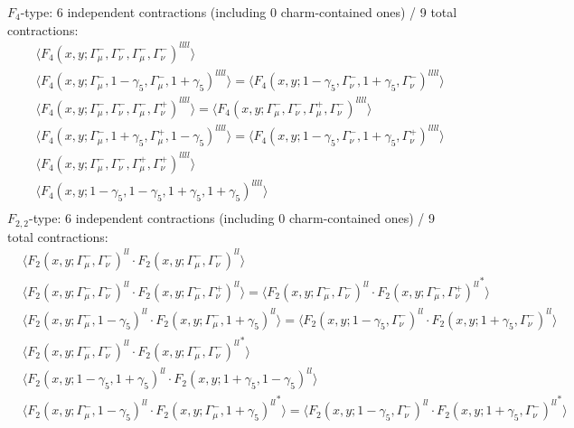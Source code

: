 $F_4$-type: 6 independent contractions (including 0 charm-contained ones) / 9 total contractions:
\begin{align*}
&\Big\langle F_4(x,y;\Gamma_\mu^-,\Gamma_\nu^-,\Gamma_\mu^-,\Gamma_\nu^-)^{llll}\Big\rangle\\
&\Big\langle F_4(x,y;\Gamma_\mu^-,1-\gamma_5,\Gamma_\mu^-,1+\gamma_5)^{llll}\Big\rangle
=\Big\langle F_4(x,y;1-\gamma_5,\Gamma_\nu^-,1+\gamma_5,\Gamma_\nu^-)^{llll}\Big\rangle\\
&\Big\langle F_4(x,y;\Gamma_\mu^-,\Gamma_\nu^-,\Gamma_\mu^-,\Gamma_\nu^+)^{llll}\Big\rangle
=\Big\langle F_4(x,y;\Gamma_\mu^-,\Gamma_\nu^-,\Gamma_\mu^+,\Gamma_\nu^-)^{llll}\Big\rangle\\
&\Big\langle F_4(x,y;\Gamma_\mu^-,1+\gamma_5,\Gamma_\mu^+,1-\gamma_5)^{llll}\Big\rangle
=\Big\langle F_4(x,y;1-\gamma_5,\Gamma_\nu^-,1+\gamma_5,\Gamma_\nu^+)^{llll}\Big\rangle\\
&\Big\langle F_4(x,y;\Gamma_\mu^-,\Gamma_\nu^-,\Gamma_\mu^+,\Gamma_\nu^+)^{llll}\Big\rangle\\
&\Big\langle F_4(x,y;1-\gamma_5,1-\gamma_5,1+\gamma_5,1+\gamma_5)^{llll}\Big\rangle\\
\end{align*}
$F_{2,2}$-type: 6 independent contractions (including 0 charm-contained ones) / 9 total contractions:
\begin{align*}
&\Big\langle F_2(x,y;\Gamma_\mu^-,\Gamma_\nu^-)^{ll} \cdot F_2(x,y;\Gamma_\mu^-,\Gamma_\nu^-)^{ll}\Big\rangle\\
&\Big\langle F_2(x,y;\Gamma_\mu^-,\Gamma_\nu^-)^{ll} \cdot F_2(x,y;\Gamma_\mu^-,\Gamma_\nu^+)^{ll}\Big\rangle
=\Big\langle F_2(x,y;\Gamma_\mu^-,\Gamma_\nu^-)^{ll} \cdot {F_2(x,y;\Gamma_\mu^-,\Gamma_\nu^+)^{ll}}^*\Big\rangle\\
&\Big\langle F_2(x,y;\Gamma_\mu^-,1-\gamma_5)^{ll} \cdot F_2(x,y;\Gamma_\mu^-,1+\gamma_5)^{ll}\Big\rangle
=\Big\langle F_2(x,y;1-\gamma_5,\Gamma_\nu^-)^{ll} \cdot F_2(x,y;1+\gamma_5,\Gamma_\nu^-)^{ll}\Big\rangle\\
&\Big\langle F_2(x,y;\Gamma_\mu^-,\Gamma_\nu^-)^{ll} \cdot {F_2(x,y;\Gamma_\mu^-,\Gamma_\nu^-)^{ll}}^*\Big\rangle\\
&\Big\langle F_2(x,y;1-\gamma_5,1+\gamma_5)^{ll} \cdot F_2(x,y;1+\gamma_5,1-\gamma_5)^{ll}\Big\rangle\\
&\Big\langle F_2(x,y;\Gamma_\mu^-,1-\gamma_5)^{ll} \cdot {F_2(x,y;\Gamma_\mu^-,1+\gamma_5)^{ll}}^*\Big\rangle
=\Big\langle F_2(x,y;1-\gamma_5,\Gamma_\nu^-)^{ll} \cdot {F_2(x,y;1+\gamma_5,\Gamma_\nu^-)^{ll}}^*\Big\rangle\\
\end{align*}
